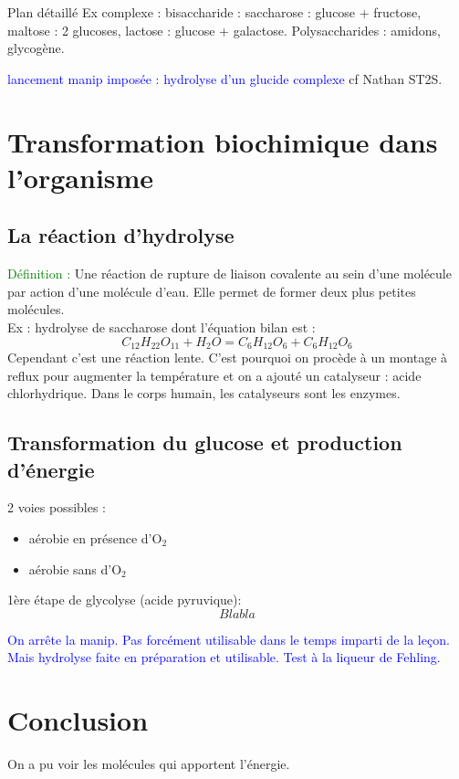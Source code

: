 \begin{reportBlock}{Plan détaillé}
Ex complexe : bisaccharide : saccharose : glucose + fructose, maltose : 2 glucoses, lactose : glucose + galactose. Polysaccharides : amidons, glycogène.

\textcolor{blue}{lancement manip imposée : hydrolyse d'un glucide complexe} cf Nathan ST2S.

\section{Transformation biochimique dans l'organisme}

\subsection{La réaction d'hydrolyse}

\textcolor{green}{Définition :} Une réaction de rupture de liaison covalente au sein d'une molécule par action d'une molécule d'eau. Elle permet de former deux plus petites molécules.\\

Ex : hydrolyse de saccharose dont l'équation bilan est :
\begin{equation}
    C_{12}H_{22}O_{11} + H_2O = C_6H_{12}O_6 + C_6H_{12}O_6
\end{equation}
Cependant c'est une réaction lente. C'est pourquoi on procède à un montage à reflux pour augmenter la température et on a ajouté un catalyseur : acide chlorhydrique. Dans le corps humain, les catalyseurs sont les enzymes.

\subsection{Transformation du glucose et production d'énergie}

2 voies possibles :
\begin{itemize}
    \item aérobie en présence d'O$_2$
    \item aérobie sans d'O$_2$
\end{itemize}

1ère étape de glycolyse (acide pyruvique):
\begin{equation}
Blabla    
\end{equation}

\textcolor{blue}{On arrête la manip. Pas forcément utilisable dans le temps imparti de la leçon. Mais hydrolyse faite en préparation et utilisable. Test à la liqueur de Fehling.}

\section{Conclusion} 
On a pu voir les molécules qui apportent l'énergie.
\end{reportBlock}